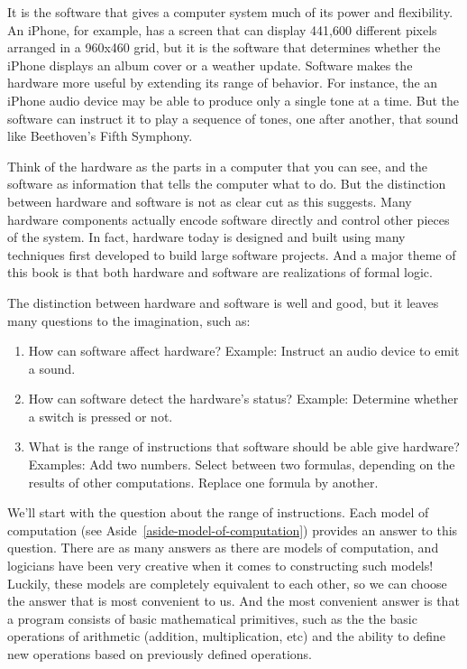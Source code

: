 It is the software that gives a computer system much of its power and
flexibility. An iPhone, for example, has a screen that
can display 441,600 different pixels arranged in a 960x460
grid, but it is the software that determines whether the
iPhone displays an album cover or a weather update.
Software makes the hardware more useful by extending its range of
behavior. For instance, the an iPhone audio device may be able to produce
only a single tone at a time. But the software can instruct it to
play a sequence of tones, one after another, that sound like Beethoven's Fifth Symphony.

Think of the hardware as
the parts in a computer that you can see, and the software
as information that tells the computer what to do.
But the distinction between hardware and software is not as
clear cut as this suggests. Many hardware components actually
encode software directly and control other pieces of the system.
In fact, hardware today is designed and built using many techniques
first developed to build large software projects.  And a major theme
of this book is that both hardware and software are realizations of formal
logic.

The distinction between hardware and software is well and good,
but it leaves many questions to the imagination, such as:
\begin{enumerate}
\item How can software affect hardware? Example: Instruct an audio
        device to emit a sound.
\item How can software detect the hardware's status? Example:
        Determine whether a switch is pressed or not.
\item What is the range of instructions that software should be able give hardware?
        Examples: Add two numbers. Select between two formulas, depending on the results of other computations. Replace one formula by another.
\end{enumerate}

We'll start with the question about the range of instructions.  
Each model of computation (see Aside~\ref{aside-model-of-computation})
provides an answer to this question. 
There are as many answers as there are
models of computation, and logicians have been very creative when it
comes to constructing such models!  Luckily, these models are
completely equivalent to each other, so we can choose the answer
that is most convenient to us.  And the most convenient answer is
that a program consists of basic mathematical primitives, such as
the the basic operations of arithmetic (addition, multiplication, etc) 
and the ability to define new operations
based on previously defined operations.

